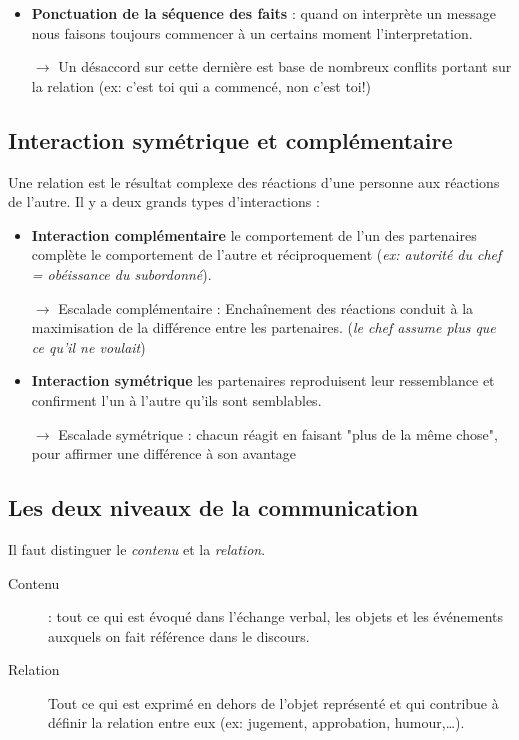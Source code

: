 \documentclass[11pt]{article} %
\begin{document}
\begin{itemize}
    \item \textbf{Ponctuation de la séquence des faits} : quand on
    interprète un message nous faisons toujours commencer à un
    certains moment l'interpretation.
    \item[$\to$]
    Un désaccord sur cette dernière est base de nombreux conflits
    portant sur la relation (ex: c'est toi qui a commencé, non c'est toi!)
\end{itemize}


\subsection{Interaction symétrique et complémentaire}
Une relation est le résultat complexe des réactions d'une personne aux
réactions de l'autre.
Il y a deux grands types d'interactions :

\begin{itemize}
    \item \textbf{Interaction complémentaire} le comportement
    de l'un des partenaires complète le comportement de l'autre
    et réciproquement (\textit{ex: autorité du chef = obéissance du
    subordonné}).

\item[$\to$] Escalade complémentaire : Enchaînement des
    réactions conduit à la maximisation de la différence entre les
    partenaires. (\textit{le chef assume plus que ce qu'il ne voulait})

    \item \textbf{Interaction symétrique} les partenaires reproduisent
    leur ressemblance et confirment l'un à l'autre qu'ils sont
    semblables.

\item[$\to$] Escalade symétrique : chacun réagit en faisant "plus de la
    même chose", pour affirmer une différence à son avantage

\end{itemize}

\subsection{Les deux niveaux de la communication}

Il faut distinguer le \textit{contenu} et la \textit{relation}.

\begin{description}
\item[Contenu] : tout ce qui est évoqué dans l'échange verbal,
les objets et les événements auxquels on fait référence dans le
discours.

\item[Relation] Tout ce qui est exprimé en dehors de l'objet
représenté et qui contribue à définir la relation entre eux (ex:
jugement, approbation, humour,\ldots).
\end{description}
\end{document}

